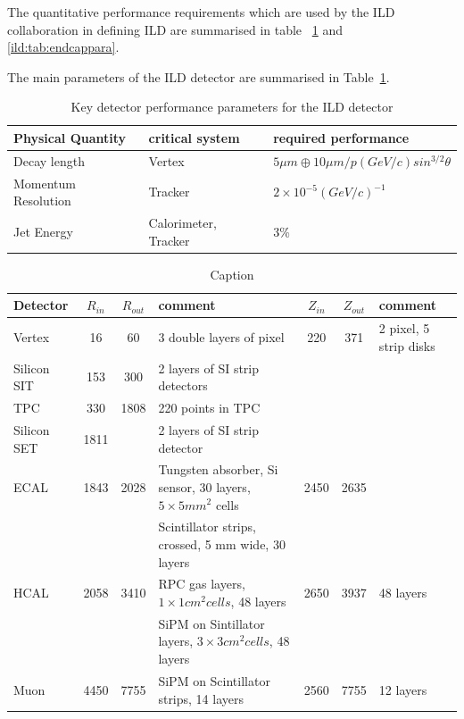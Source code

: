 \documentclass[%
 amsmath,amssymb,
 aps,
]{revtex4-1}
\renewcommand{\toprule}{\hline}
\newcommand{\midrule}{\hline}
\newcommand{\bottomrule}{\hline}
\begin{document}
The quantitative performance requirements which are used by the ILD collaboration in defining ILD are summarised in table~
\ref{ild:tab:barrelpara} and \ref{ild:tab:endcappara}.

The main parameters of the ILD detector are summarised in Table~\ref{ild:tab:barrelpara}.

\begin{table}\small
\begin{center}
    \begin{tabular}{|l|l|l|}
\toprule
Physical Quantity & critical system & required performance\\
\midrule
Decay length & Vertex & $ 5 \mu m \oplus 10 \mu m / p(GeV/c)sin^{3/2}\theta$ \\
\midrule
Momentum Resolution & Tracker & $2 \times 10^{-5} (GeV/c)^{-1}$ \\
\midrule
Jet Energy & Calorimeter, Tracker & 3\% \\
\bottomrule
\end{tabular}
\end{center}
\caption{Key detector performance parameters for the ILD detector}
\label{ild:tab:barrelpara}
\end{table}

\begin{table}[]
    \centering
    \begin{tabular}{l|c|c|p{4cm}| c| c| p{4cm}}
        Detector & $R_{in}$ & $R_{out}$ & comment & $Z_{in}$ & $Z_{out}$ & comment \\
        \midrule
        Vertex & 16 & 60 & 3 double layers of pixel & 220 & 371 & 2 pixel, 5 strip disks\\
        Silicon SIT & 153& 300 & 2 layers of SI strip detectors& & & \\
        TPC & 330 & 1808 & 220 points in TPC & & & \\
        Silicon SET & 1811& & 2 layers of SI strip detector & & & \\
        ECAL & 1843 & 2028 & Tungsten absorber, Si sensor, 30 layers, $5 \times 5 mm^2$ cells & 2450 & 2635 & \\
             &      &      & Scintillator strips, crossed, 5 mm wide, 30 layers& & & \\
        HCAL & 2058 & 3410 & RPC gas layers, $1 \times 1 cm^2 cells$, 48 layers& 2650 & 3937 & 48 layers \\
             &      &      & SiPM on Sintillator layers, $3 \times 3 cm^2 cells$, 48 layers& & & \\
        Muon & 4450 & 7755 & SiPM on Scintillator strips, 14 layers & 2560 & 7755 & 12 layers\\
\bottomrule
    \end{tabular}
    \caption{Caption}
    \label{tab:my_label}
\end{table}
\end{document}
